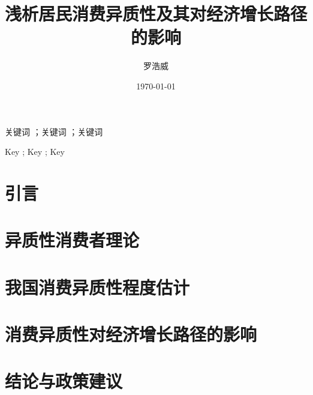 \documentclass[supercite]{HustGraduPaper}
\title{浅析居民消费异质性及其对经济增长路径的影响}
\author{罗浩威}
\date{\today}
\begin{document}
    \maketitle
    \statement
    \clearpage 
    
    \begin{cnabstract}{关键词 ；关键词 ；关键词 }
		
    \end{cnabstract}
    
    \begin{enabstract}{Key ; Key ; Key }
		
    \end{enabstract}

    \tableofcontents
    \clearpage

    \section{引言}
    

    \section{异质性消费者理论}
    
    \section{我国消费异质性程度估计}

    \section{消费异质性对经济增长路径的影响}

    \section{结论与政策建议}
	
\end{document}
